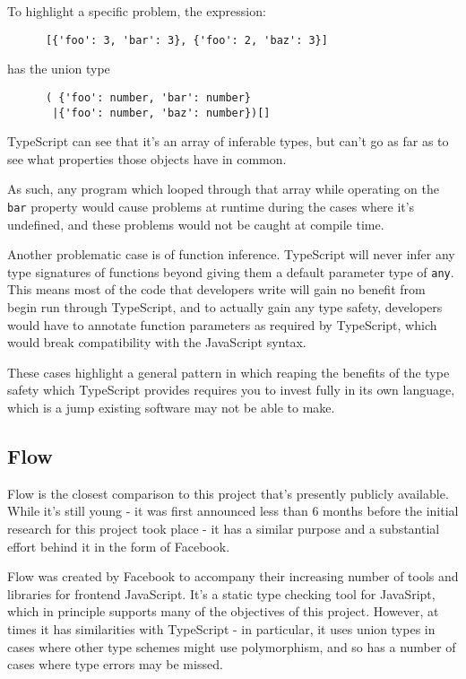 \documentclass[british, twoside, openright]{bhamthesis}
\theoremstyle{definition}
\begin{document}
    To highlight a specific problem, the expression:
    \begin{lstlisting}
      [{'foo': 3, 'bar': 3}, {'foo': 2, 'baz': 3}]
    \end{lstlisting}
    has the union type
    \begin{lstlisting}
      ( {'foo': number, 'bar': number}
       |{'foo': number, 'baz': number})[]
    \end{lstlisting}

    TypeScript can see that it's an array of inferable types, but can't go as far as to see what properties those objects have in common.

    As such, any program which looped through that array while operating on the \texttt {bar} property would cause problems at runtime during the cases where it's undefined, and these problems would not be caught at compile time.

    Another problematic case is of function inference. TypeScript will never infer any type signatures of functions beyond giving them a default parameter type of \texttt{any}. This means most of the code that developers write will gain no benefit from begin run through TypeScript, and to actually gain any type safety, developers would have to annotate function parameters as required by TypeScript, which would break compatibility with the JavaScript syntax.

    These cases highlight a general pattern in which reaping the benefits of the type safety which TypeScript provides requires you to invest fully in its own language, which is a jump existing software may not be able to make.

  \subsection{Flow}
    Flow is the closest comparison to this project that's presently publicly available. While it's still young - it was first announced less than 6 months before the initial research for this project took place - it has a similar purpose and a substantial effort behind it in the form of Facebook.

    Flow was created by Facebook to accompany their increasing number of tools and libraries for frontend JavaScript. It's a static type checking tool for JavaSript, which in principle supports many of the objectives of this project. However, at times it has similarities with TypeScript - in particular, it uses union types in cases where other type schemes might use polymorphism, and so has a number of cases where type errors may be missed.
\end{document}
